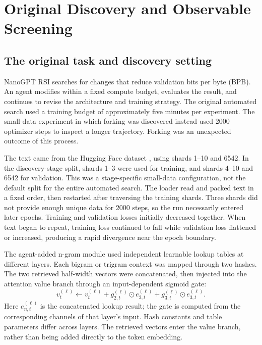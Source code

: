 \section{Original Discovery and Observable Screening}
\label{app:discovery}

\subsection{The original task and discovery setting}
\label{app:original-setting}

NanoGPT RSI searches for changes that reduce validation bits per byte (BPB). An agent modifies  within a fixed compute budget, evaluates the result, and continues to revise the architecture and training strategy. The original automated search used a training budget of approximately five minutes per experiment. The small-data experiment in which forking was discovered instead used 2000 optimizer steps to inspect a longer trajectory. Forking was an unexpected outcome of this process.

The text came from the Hugging Face dataset \href{https://huggingface.co/datasets/karpathy/climbmix-400b-shuffle}{}, using shards 1--10 and 6542. In the discovery-stage split, shards 1--3 were used for training, and shards 4--10 and 6542 for validation. This was a stage-specific small-data configuration, not the default split for the entire automated search. The loader read and packed text in a fixed order, then restarted after traversing the training shards. Three shards did not provide enough unique data for 2000 steps, so the run necessarily entered later epochs. Training and validation losses initially decreased together. When text began to repeat, training loss continued to fall while validation loss flattened or increased, producing a rapid divergence near the epoch boundary.

The agent-added n-gram module used independent learnable lookup tables at different layers. Each bigram or trigram context was mapped through two hashes. The two retrieved half-width vectors were concatenated, then injected into the attention value branch through an input-dependent sigmoid gate:
\begin{equation}
 v_t^{(\ell)}\leftarrow v_t^{(\ell)}
 +g_{2,t}^{(\ell)}\odot e_{2,t}^{(\ell)}
 +g_{3,t}^{(\ell)}\odot e_{3,t}^{(\ell)}.
 \label{eq:original-injection}
\end{equation}
Here $e_{n,t}^{(\ell)}$ is the concatenated lookup result; the gate is computed from the corresponding channels of that layer's input. Hash constants and table parameters differ across layers. The retrieved vectors enter the value branch, rather than being added directly to the token embedding.

